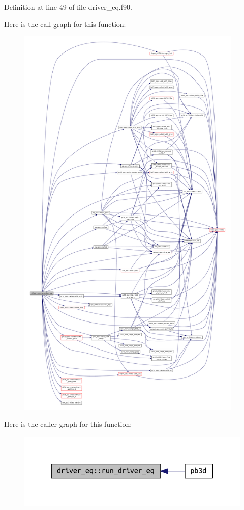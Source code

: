 Definition at line 49 of file driver\+\_\+eq.\+f90.

Here is the call graph for this function\+:
\nopagebreak
\begin{figure}[H]
\begin{center}
\leavevmode
\includegraphics[height=550pt]{namespacedriver__eq_adc9d5dff288fa512e5ef885627d940cc_cgraph}
\end{center}
\end{figure}
Here is the caller graph for this function\+:\nopagebreak
\begin{figure}[H]
\begin{center}
\leavevmode
\includegraphics[width=318pt]{namespacedriver__eq_adc9d5dff288fa512e5ef885627d940cc_icgraph}
\end{center}
\end{figure}

